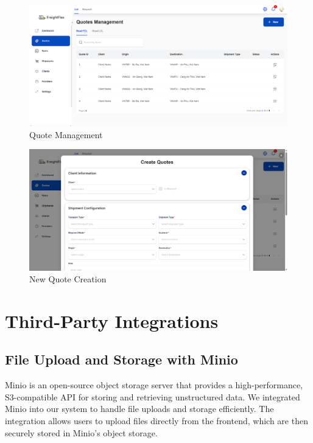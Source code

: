 \begin{figure}[H]
    \centering
    \includegraphics[width=15cm]{graphics/UI/quote-managemet.png}
    \caption{Quote Management}
    \label{fig:quote-management}
\end{figure}

\begin{figure}[H]
    \centering
    \includegraphics[width=15cm]{graphics/UI/new-quotes.png}
    \caption{New Quote Creation}
    \label{fig:new-quotes}
\end{figure}

\section{Third-Party Integrations}
\subsection{File Upload and Storage with Minio}
Minio \cite{minio} is an open-source object storage server that provides a high-performance, S3-compatible API for storing and retrieving unstructured data. We integrated Minio into our system to handle file uploads and storage efficiently. The integration allows users to upload files directly from the frontend, which are then securely stored in Minio's object storage.

